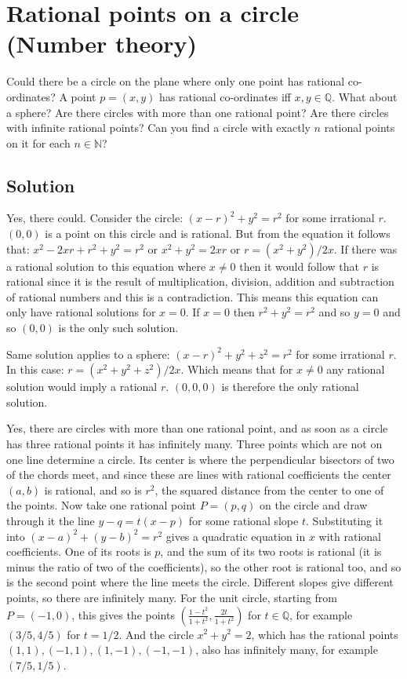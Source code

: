 \section{Rational points on a circle (Number theory)}
Could there be a circle on the plane where only one point has rational co-ordinates? A point $p=(x,y)$ has rational co-ordinates iff $x,y\in\mathbb{Q}$. What about a sphere? Are there circles with more than one rational point? Are there circles with infinite rational points? Can you find a circle with exactly $n$ rational points on it for each $n\in\mathbb{N}$?

\subsection{Solution}
Yes, there could. Consider the circle: $(x-r)^2+y^2=r^2$ for some irrational $r$.
$(0,0)$ is a point on this circle and is rational. But from the equation it follows
that: $x^2-2xr+r^2+y^2=r^2$ or $x^2+y^2=2xr$ or $r=(x^2+y^2)/2x$. If there
was a rational solution to this equation where $x\ne0$ then it would follow that
$r$ is rational since it is the result of multiplication, division, addition and subtraction
of rational numbers and this is a contradiction. This means this equation can only
have rational solutions for $x=0$. If $x=0$ then $r^2+y^2=r^2$ and so $y=0$ and so
$(0,0)$ is the only such solution.

Same solution applies to a sphere: $(x-r)^2+y^2+z^2=r^2$ for some irrational $r$.
In this case: $r=(x^2+y^2+z^2)/2x$. Which means that for $x\ne0$ any rational solution would imply a rational $r$.
$(0,0,0)$ is therefore the only rational solution.

Yes, there are circles with more than one rational point, and as soon as a circle has three rational
points it has infinitely many. Three points which are not on one line determine a circle. Its center is
where the perpendicular bisectors of two of the chords meet, and since these are lines with rational
coefficients the center $(a,b)$ is rational, and so is $r^2$, the squared distance from the center to one
of the points. Now take one rational point $P=(p,q)$ on the circle and draw through it the line
$y-q=t(x-p)$ for some rational slope $t$. Substituting it into $(x-a)^2+(y-b)^2=r^2$ gives a quadratic
equation in $x$ with rational coefficients. One of its roots is $p$, and the sum of its two roots is
rational (it is minus the ratio of two of the coefficients), so the other root is rational too, and so is
the second point where the line meets the circle. Different slopes give different points, so there are
infinitely many. For the unit circle, starting from $P=(-1,0)$, this gives the points
$\left(\frac{1-t^2}{1+t^2},\frac{2t}{1+t^2}\right)$ for $t\in\mathbb{Q}$, for example $(3/5,4/5)$ for $t=1/2$.
And the circle $x^2+y^2=2$, which has the rational points $(1,1),(-1,1),(1,-1),(-1,-1)$, also has
infinitely many, for example $(7/5,1/5)$.

